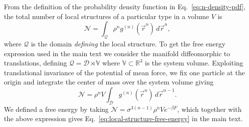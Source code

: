 \documentclass[11pt,twoside]{report}
\begin{document}
From the definition of the probability density function in Eq.\ \eqref{eq:n-density-pdf}, the total number of local structures of a particular type in a volume $V$ is
\begin{equation}\label{eq:structure-population}
  \mathcal{N} =
  \int_{\mathcal{Q}} \rho^n g^{(n)}(\vec{r}^n) \, d\vec{r}^n,
\end{equation}
where $\mathcal{Q}$ is the domain \emph{defining} the local structure.
To get the free energy expression used in the main text we consider the manifold diffeomorphic to translations, defining $\mathcal{Q} = \mathcal{D} \rtimes \mathbb{V}$ where $\mathbb{V}\subset \mathbb{R}^3$ is the system volume.
Exploiting translational invariance of the potential of mean force, we fix one particle at the origin and integrate the center of mass over the system volume giving
\begin{equation}
  \mathcal{N} =
  \rho^n V \int_{\mathcal{D}} g^{(n)}(\vec{r}^n) \, d\vec{r}^{n-1}.
\end{equation}
We defined a free energy by taking $\mathcal{N} = \sigma^{3(n-1)} \rho^n V e^{-\beta F}$, which together with the above expression gives Eq.\ \eqref{eq:local-structure-free-energy} in the main text.
\end{document}
